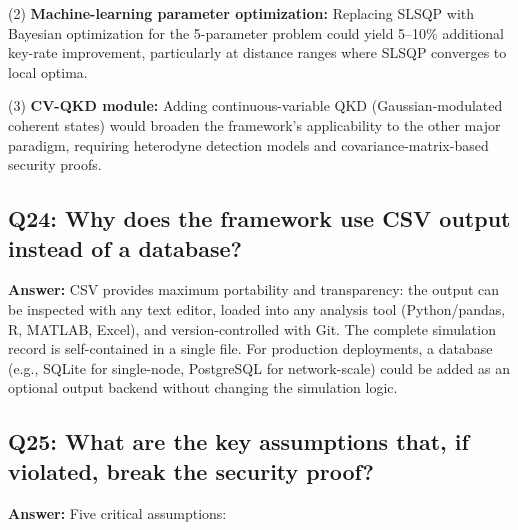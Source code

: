 \documentclass[11pt,a4paper,oneside]{report}
\begin{document}
(2) \textbf{Machine-learning parameter optimization:} Replacing SLSQP with Bayesian optimization for the 5-parameter problem could yield 5–10\% additional key-rate improvement, particularly at distance ranges where SLSQP converges to local optima.

(3) \textbf{CV-QKD module:} Adding continuous-variable QKD (Gaussian-modulated coherent states) would broaden the framework's applicability to the other major paradigm, requiring heterodyne detection models and covariance-matrix-based security proofs.

\subsection*{Q24: Why does the framework use CSV output instead of a database?}
\textbf{Answer:} CSV provides maximum portability and transparency: the output can be inspected with any text editor, loaded into any analysis tool (Python/pandas, R, MATLAB, Excel), and version-controlled with Git. The complete simulation record is self-contained in a single file. For production deployments, a database (e.g., SQLite for single-node, PostgreSQL for network-scale) could be added as an optional output backend without changing the simulation logic.

\subsection*{Q25: What are the key assumptions that, if violated, break the security proof?}
\textbf{Answer:} Five critical assumptions:
\end{document}
